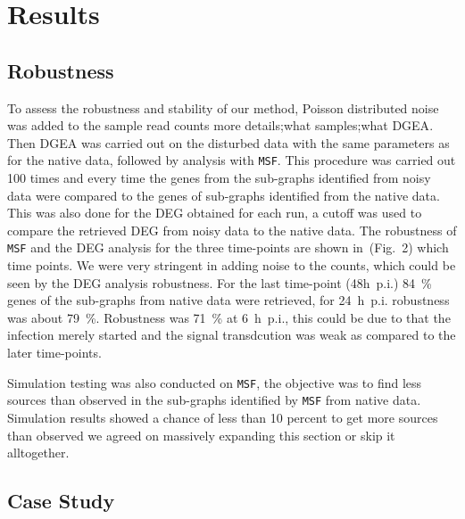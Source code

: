 \documentclass[10pt,a4paper,twocolumn]{article}
\newcommand{\TODO}[1]{\begingroup\color{red}#1\endgroup}
\begin{document}
\section*{Results}

\subsection*{Robustness}

To assess the robustness and stability of our method, Poisson
distributed noise was added to the sample read counts \TODO{more details;what samples;what DGEA}. Then DGEA was
carried out on the disturbed data with the same parameters as for the
native data, followed by analysis with \texttt{MSF}. This procedure was carried out 100 times
and every time the genes from the sub-graphs identified from noisy
data were compared to the genes of sub-graphs identified from the
native data. This was also done for the DEG obtained for each run, a
cutoff was used to compare the retrieved DEG from noisy data to the
native data.  The robustness of \texttt{MSF} and the DEG analysis for
the three time-points are shown in~(Fig.~2) \TODO{which time points}. We were very stringent in
adding noise to the counts, which could be seen by the DEG analysis
robustness. For the last time-point (48h~p.i.) 84~\% genes of the
sub-graphs from native data were retrieved, for 24~h~p.i. robustness was
about 79~\%. Robustness was 71~\% at 6~h~p.i., this could be due to that the
infection merely started and the signal transdcution was weak as
compared to the later time-points.

Simulation testing was also conducted on \texttt{MSF}, the objective
was to find less sources than observed in the sub-graphs identified by
\texttt{MSF} from native data. Simulation results showed a chance of
less than 10 percent to get more sources than observed \TODO{we agreed on massively expanding this section or skip it alltogether}.

\subsection*{Case Study}
\end{document}
